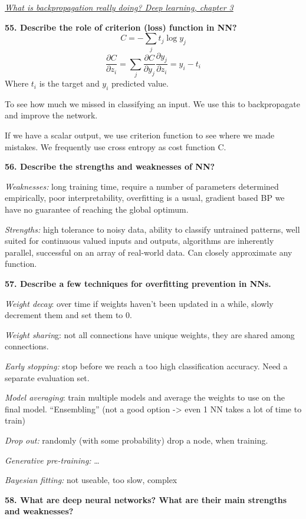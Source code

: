 \href{https://www.youtube.com/watch?v=Ilg3gGewQ5U}{\textit{What is
backpropagation really doing? \textbar{} Deep learning, chapter 3}}

\textbf{55. Describe the role of criterion (loss) function in
NN?}
\[C = -\sum_j t_j \log y_j \]
\[ \frac{\partial C}{\partial z_i} = \sum_j\frac{\partial C}{\partial y_j} \frac{\partial y_j}{\partial z_i} = y_i - t_i \]
Where $t_i$ is the target and $y_i$ predicted value.

To see how much we missed in classifying an input. We use this to
backpropagate and improve the network.

If we have a scalar output, we use criterion function to see where we
made mistakes. We frequently use cross entropy as cost function C.

\textbf{56. Describe the strengths and weaknesses of NN?}

\textit{Weaknesses:} long training time, require a number of
parameters determined empirically, poor interpretability, overfitting is
a usual, gradient based BP we have no guarantee of reaching the global
optimum.

\textit{Strengths:} high tolerance to noisy data, ability to classify
untrained patterns, well suited for continuous valued inputs and
outputs, algorithms are inherently parallel, successful on an array of
real-world data. Can closely approximate any function.

\textbf{57. Describe a few techniques for overfitting prevention in
NNs.}

\textit{Weight decay}: over time if weights haven't been updated in a
while, slowly decrement them and set them to 0.

\textit{Weight sharin}g: not all connections have unique weights,
they are shared among connections.

\textit{Early stopping:} stop before we reach a too high
classification accuracy. Need a separate evaluation set.

\textit{Model averaging}: train multiple models and average the
weights to use on the final model. ``Ensembling'' (not a good option
-\textgreater{} even 1 NN takes a lot of time to train)

\textit{Drop out:} randomly (with some probability) drop a node, when
training.

\textit{Generative pre-training:} \ldots{}

\textit{Bayesian fitting:} not useable, too slow, complex

\textbf{58. What are deep neural networks? What are their main strengths
and weaknesses?}

